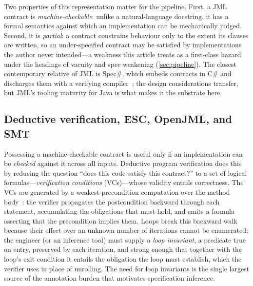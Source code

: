 Two properties of this representation matter for the pipeline. First, a JML contract is \emph{machine-checkable}: unlike a natural-language docstring, it has a formal semantics against which an implementation can be mechanically judged. Second, it is \emph{partial}: a contract constrains behaviour only to the extent its clauses are written, so an under-specified contract may be satisfied by implementations the author never intended---a weakness this article treats as a first-class hazard under the headings of vacuity and spec weakening (\cref{sec:pipeline}). The closest contemporary relative of JML is Spec\#, which embeds contracts in C\# and discharges them with a verifying compiler~\cite{barnett2005specsharp}; the design considerations transfer, but JML's tooling maturity for Java is what makes it the substrate here.

\subsection{Deductive verification, ESC, OpenJML, and SMT}\label{subsec:bg-verification}

Possessing a machine-checkable contract is useful only if an implementation can be \emph{checked} against it across all inputs. Deductive program verification does this by reducing the question ``does this code satisfy this contract?'' to a set of logical formulas---\emph{verification conditions} (VCs)---whose validity entails correctness. The VCs are generated by a weakest-precondition computation over the method body~\cite{dijkstra1976discipline}: the verifier propagates the postcondition backward through each statement, accumulating the obligations that must hold, and emits a formula asserting that the precondition implies them. Loops break this backward walk because their effect over an unknown number of iterations cannot be enumerated; the engineer (or an inference tool) must supply a \emph{loop invariant}, a predicate true on entry, preserved by each iteration, and strong enough that together with the loop's exit condition it entails the obligation the loop must establish, which the verifier uses in place of unrolling. The need for loop invariants is the single largest source of the annotation burden that motivates specification inference.

